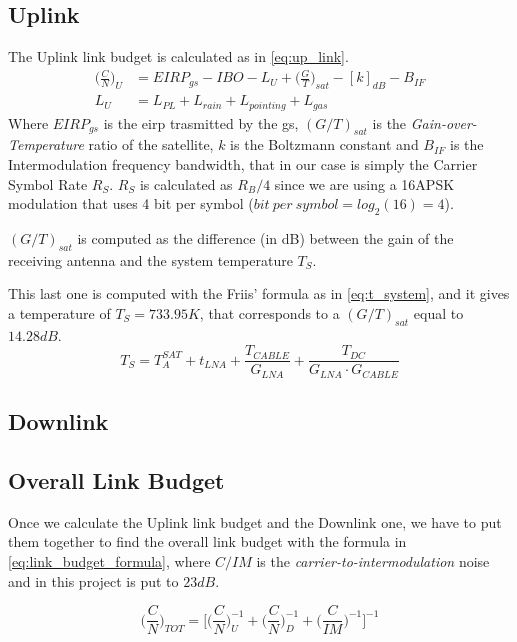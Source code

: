 \subsection{Uplink}
	The Uplink link budget is calculated as in \autoref{eq:up_link}.
	\begin{equation} \label{eq:up_link}
		\begin{split}
			\bigg(\frac{C}{N}\bigg)_U &= EIRP_{gs} - IBO - L_U + \bigg(\frac{G}{T}\bigg)_{sat} - [k]_{dB} - B_{IF}\\
			L_U &= L_{PL} + L_{rain} + L_{pointing} + L_{gas}
		\end{split}
	\end{equation}
	Where $EIRP_{gs}$ is the \gls{eirp} trasmitted by the \gls{gs}, $(G/T)_{sat}$ is the \textit{Gain-over-Temperature} ratio of the satellite, $k$ is the Boltzmann constant and $B_{IF}$ is the Intermodulation frequency bandwidth, that in our case is simply the Carrier Symbol Rate $R_S$.
	$R_S$ is calculated as $R_B/4$ since we are using a 16APSK modulation that uses 4 bit per symbol ($bit ~per ~symbol = log_2(16) = 4$).

	$(G/T)_{sat}$ is computed as the difference (in dB) between the gain of the receiving antenna and the system temperature $T_S$.

	This last one is computed with the Friis' formula as in \autoref{eq:t_system}, and it gives a temperature of $T_S = 733.95K$, that corresponds to a $(G/T)_{sat}$ equal to $14.28dB$.
	\begin{equation}\label{eq:t_system}
		T_S = T_A^{SAT} + t_{LNA} + \frac{T_{CABLE}}{G_{LNA}} + \frac{T_{DC}}{G_{LNA}\cdot G_{CABLE}}
	\end{equation}
\subsection{Downlink}
\subsection{Overall Link Budget}
Once we calculate the Uplink link budget and the Downlink one, we have to put them together to find the overall link budget with the formula in \autoref{eq:link_budget_formula}, where $C/IM$ is the \textit{carrier-to-intermodulation} noise and in this project is put to $23dB$.

\begin{equation}\label{eq:link_budget_formula}
	\bigg(\frac{C}{N}\bigg)_{TOT} = \bigg[\bigg(\frac{C}{N}\bigg)^{-1}_U + \bigg(\frac{C}{N}\bigg)^{-1}_D + \bigg(\frac{C}{IM}\bigg)^{-1}\bigg]^{-1}
\end{equation}

